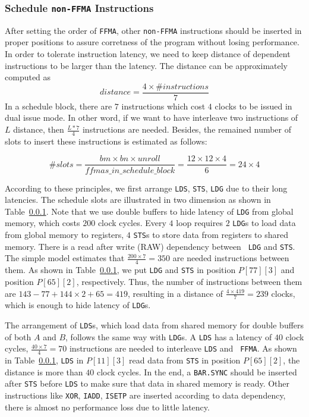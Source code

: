\documentclass{sig-alternate-05-2015}
\begin{document}
\subsubsection{Schedule {\tt non-FFMA} Instructions}

After setting the order of {\tt FFMA}, other {\tt non-FFMA} instructions should be inserted in proper positions to assure
corretness of the program without losing performance. In order to tolerate instruction latency, we need to keep distance of dependent instructions to be larger than the latency. The distance can be approximately computed as
\begin{displaymath}
distance = \frac{4\times\#instructions}{7}
\end{displaymath}
In a schedule block, there are $7$ instructions which cost $4$ clocks to be issued in dual issue mode. In other word, if we want to have interleave
two instructions of $L$ distance, then $\frac{L*7}{4}$ instructions are needed. Besides, the remained number of slots to insert these instructions is estimated as follows:

\begin{displaymath}
\#slots = \frac{bm\times bn\times unroll}{ffmas\_in\_schedule\_block}=\frac{12\times 12\times 4}{6}=24\times 4
\end{displaymath}

According to these principles, we first arrange {\tt LDS}, {\tt STS}, {\tt LDG} due to their long latencies. The schedule slots are illustrated in two dimension as shown in Table~\ref{}.
Note that we use double buffers to hide latency of {\tt LDG} from global memory, which costs $200$ clock cycles.
Every $4$ loop requires $2$ {\tt LDG}s to load data from global memory to registers, $4$ {\tt STS}s to store data from registers to shared memory. There is a read after write (RAW) dependency between {\tt
LDG} and {\tt STS}. The simple model estimates that $\frac{200\times 7}{4} = 350$ are needed instructions between them. As shown in Table~\ref{}, we put {\tt LDG} and  {\tt STS} in position $P[77][3]$ and position $P[65][2]$, respectively. Thus, the number of instructions between them are $143-77 + 144\times 2 +
65=419$, resulting in a distance of $\frac{4\times 419}{7}=239$ clocks, which is enough to hide latency of {\tt LDG}s.

The arrangement of {\tt LDS}s, which load data from shared memory for double buffers of both $A$ and $B$, follows the same way with {\tt LDG}s.
A {\tt LDS} has a latency of $40$ clock cycles, $\frac{40\times 7}{4}=70$ instructions are needed to interleave {\tt LDS} and {\tt
FFMA}. As shown in Table~\ref{}, {\tt LDS} in $P[11][3]$ read data from {\tt STS} in position $P[65][2]$, the distance is more than $40$ clock
cycles. In the end, a {\tt BAR.SYNC} should be inserted after {\tt STS} before {\tt LDS} to make sure that data in shared memory is ready. Other instructions like {\tt XOR},
{\tt IADD}, {\tt ISETP} are inserted according to data dependency, there is almost no performance loss due to little latency.
\end{document}
